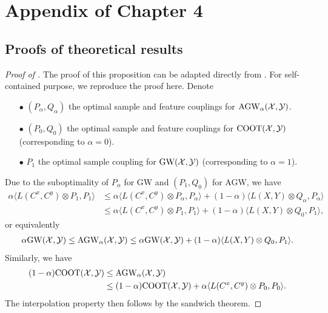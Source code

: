 \section{Appendix of Chapter 4}

\subsection{Proofs of theoretical results}

\begin{proof}[Proof of ]
  The proof of this proposition can be adapted directly from \citep{Vayer19b}.
  For self-contained purpose, we reproduce the proof here. Denote
  \begin{itemize}
      \item[$\bullet$] $(P_{\alpha}, Q_{\alpha})$ the optimal sample and feature couplings for
      $\text{AGW}_{\alpha}(\mathcal X, \mathcal Y)$.

      \item[$\bullet$] $(P_0, Q_0)$ the optimal sample and feature couplings for
      $\text{COOT}(\mathcal X, \mathcal Y)$ (corresponding to $\alpha = 0$).

      \item[$\bullet$] $P_1$ the optimal sample coupling for $\text{GW}(\mathcal X, \mathcal Y)$
      (corresponding to $\alpha = 1$).
  \end{itemize}
  Due to the suboptimality of $P_{\alpha}$ for GW and $(P_1, Q_0)$ for AGW, we have
  \begin{align}
      \alpha \langle L(C^x, C^y) \otimes P_1, P_1 \rangle
      &\leq \alpha \langle L(C^x, C^y) \otimes P_{\alpha}, P_{\alpha} \rangle
      + (1 - \alpha) \langle L(X, Y) \otimes Q_{\alpha}, P_{\alpha} \rangle \\
      &\leq \alpha \langle L(C^x, C^y) \otimes P_1, P_1 \rangle
      + (1 - \alpha) \langle L(X, Y) \otimes Q_0, P_1 \rangle,
  \end{align}
  or equivalently
  \begin{align}
      \alpha \text{GW}(\mathcal X, \mathcal Y) \leq \text{AGW}_{\alpha}(\mathcal X, \mathcal Y) \leq \alpha \text{GW}(\mathcal X, \mathcal Y)
      + (1 - \alpha) \langle L(X, Y) \otimes Q_0, P_1 \rangle.
  \end{align}
  Similarly, we have
  \begin{align}
      (1 - \alpha) \text{COOT}(\mathcal X, \mathcal Y) &\leq \text{AGW}_{\alpha}(\mathcal X, \mathcal Y) \\
      &\leq (1 - \alpha) \text{COOT}(\mathcal X, \mathcal Y) + \alpha \langle L(C^x, C^y) \otimes P_0, P_0 \rangle.
  \end{align}
  The interpolation property then follows by the sandwich theorem.


\end{proof}

